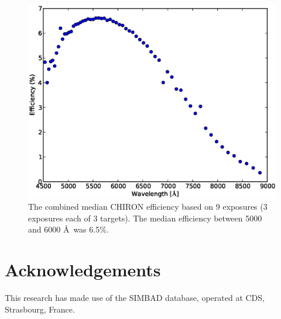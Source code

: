 \documentclass[iop]{emulateapj}
\begin{document}
\begin{figure}[ht]
\includegraphics[scale=0.4,angle=0]{fig_medeff.eps}
\caption{\label{fig:medeff} The combined median CHIRON efficiency based on 9 exposures (3 exposures each of 3 targets). The median efficiency between 5000 and 6000 \AA~was 6.5\%.}
\end{figure}


\section{Acknowledgements}
This research has made use of the SIMBAD database,
operated at CDS, Strasbourg, France.






\clearpage

\clearpage
\end{document}

